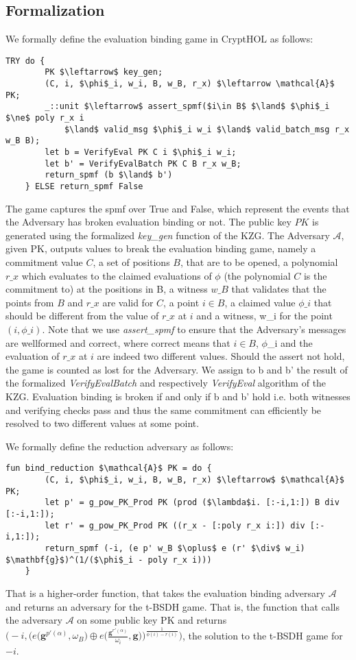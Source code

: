 \subsection{Formalization}
We formally define the evaluation binding game in CryptHOL as follows:
\begin{lstlisting}[language=isabelle]
    TRY do {
        PK $\leftarrow$ key_gen;
        (C, i, $\phi$_i, w_i, B, w_B, r_x) $\leftarrow \mathcal{A}$ PK;
        _::unit $\leftarrow$ assert_spmf($i\in B$ $\land$ $\phi$_i $\ne$ poly r_x i 
            $\land$ valid_msg $\phi$_i w_i $\land$ valid_batch_msg r_x w_B B);
        let b = VerifyEval PK C i $\phi$_i w_i;
        let b' = VerifyEvalBatch PK C B r_x w_B;
        return_spmf (b $\land$ b')
    } ELSE return_spmf False
\end{lstlisting}
The game captures the spmf over True and False, which represent the events that the Adversary has broken evaluation binding or not.
The public key $PK$ is generated using the formalized \textit{key\_gen} function of the KZG. The Adversary $\mathcal{A}$, given PK, outputs values to break the evaluation binding game, namely a commitment value $C$, a set of positions $B$, that are to be opened, a polynomial $r\_x$ which evaluates to the claimed evaluations of $\phi$ (the polynomial $C$ is the commitment to) at the positions in B, a witness $w\_B$ that validates that the points from $B$ and $r\_x$ are valid for $C$, a point $i \in B$, a claimed value $\phi\_i$ that should be different from the value of $r\_x$ at $i$ and a witness, w\_i for the point $(i,\phi\_i)$. 
Note that we use \textit{assert\_spmf} to ensure that the Adversary's messages are wellformed and correct, where correct means that $i \in B$, $\phi$\_i and the evaluation of $r\_x$ at $i$ are indeed two different values. Should the assert not hold, the game is counted as lost for the Adversary.
We assign to b and b' the result of the formalized \textit{VerifyEvalBatch} and respectively \textit{VerifyEval} algorithm of the KZG. Evaluation binding is broken if and only if b and b' hold i.e. both witnesses and verifying checks pass and thus the same commitment can efficiently be resolved to two different values at some point.

We formally define the reduction adversary as follows:
\begin{lstlisting}[language=isabelle]
    fun bind_reduction $\mathcal{A}$ PK = do {
        (C, i, $\phi$_i, w_i, B, w_B, r_x) $\leftarrow$ $\mathcal{A}$ PK;
        let p' = g_pow_PK_Prod PK (prod ($\lambda$i. [:-i,1:]) B div [:-i,1:]);
        let r' = g_pow_PK_Prod PK ((r_x - [:poly r_x i:]) div [:-i,1:]);
        return_spmf (-i, (e p' w_B $\oplus$ e (r' $\div$ w_i) $\mathbf{g}$)^(1/($\phi$_i - poly r_x i)))
    }
\end{lstlisting}
That is a higher-order function, that takes the evaluation binding adversary $\mathcal{A}$ and returns an adversary for the t-BSDH game.
That is, the function that calls the adversary $\mathcal{A}$ on some public key PK and returns $\bigl(-i, \bigl(e\bigl(\mathbf{g}^{p'(\alpha)}, \omega_B\bigr) \oplus e\bigl(\frac{\mathbf{g}^{r'(\alpha)}}{\omega_i}, \mathbf{g}\bigr)\bigr)^{\frac{1}{\phi(i)-r(i)}}\bigr)$, the solution to the t-BSDH game for $-i$. 

